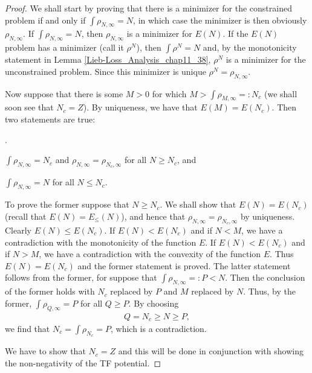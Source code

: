 \documentclass[openany, a4paper, oneside]{jsbook}
\newcounter{enum2}
\renewenvironment{enumerate}{%
\begin{list}%
{%
\arabic{enum2}.\ \,%
}%
{%
\usecounter{enum2}
\setlength{\itemindent}{0pt}%
\setlength{\leftmargin}{15pt}%
\setlength{\rightmargin}{0pt}%
\setlength{\labelsep}{0pt}%
\setlength{\labelwidth}{6pt}%
\setlength{\itemsep}{0pt}%
\setlength{\parsep}{0pt}%
\setlength{\listparindent}{0pt}%
}
}{%
\end{list}%
}
\theoremstyle{break}
\theoremstyle{breakdefn}
\newcommand{\EleqN}{E_{\leq}(N)}
\newcommand{\rhoNinfty}{\rho_{N, \infty}}
\begin{document}
\begin{proof}
We shall start by proving that there is a minimizer for the constrained problem if and only if $\int \rhoNinfty = N$,
in which case the minimizer is then obviously $\rhoNinfty$.
If $\int \rhoNinfty = N$, then $\rhoNinfty$ is a minimizer for $E (N)$.
If the $E (N)$ problem has a minimizer (call it $\rho^N$), then $\int \rho^N = N$ and,
by the monotonicity statement in Lemma \ref{Lieb-Loss_Analysis_chap11_38}, $\rho^N$ is a minimizer for the unconstrained problem.
Since this minimizer is unique $\rho^N = \rhoNinfty$.

Now suppose that there is some $M > 0$ for which $M > \int \rho_{M, \infty} =: N_c$
(we shall soon see that $N_c = Z$).
By uniqueness, we have that $E (M) = E (N_c)$.
Then two statements are true:
\begin{enumerate}
\item $\int \rhoNinfty = N_c$ and $\rhoNinfty = \rho_{N_c, \infty}$ for all $N \geq N_c$, and
\item $\int \rhoNinfty = N$ for all $N \leq N_c$.
\end{enumerate}
To prove the former suppose that $N \geq N_c$.
We shall show that $E (N) = E (N_c)$ (recall that $E (N) = \EleqN$),
and hence that $\rhoNinfty = \rho_{N_c, \infty}$ by uniqueness.
Clearly $E (N) \leq E (N_c)$.
If $E (N) < E (N_c)$ and if $N<M$, we have a contradiction with the monotonicity of the function $E$.
If $E (N) < E (N_c)$ and if $N > M$, we have a contradiction with the convexity of the function $E$.
Thus $E (N) = E (N_c)$ and the former statement is proved.
The latter statement follows from the former,
for suppose that $\int \rhoNinfty =: P < N$.
Then the conclusion of the former holds with $N_c$ replaced by $P$ and $M$ replaced by $N$.
Thus, by the former, $\int \rho_{Q, \infty} = P$ for all $Q \geq P$.
By choosing
\begin{align}
 Q = N_c \geq N \geq P,
\end{align}
we find that $N_c = \int \rho_{N_c} = P$, which is a contradiction.

We have to show that $N_c = Z$ and this will be done in conjunction with showing the non-negativity of the TF potential.


\end{proof}
\end{document}
